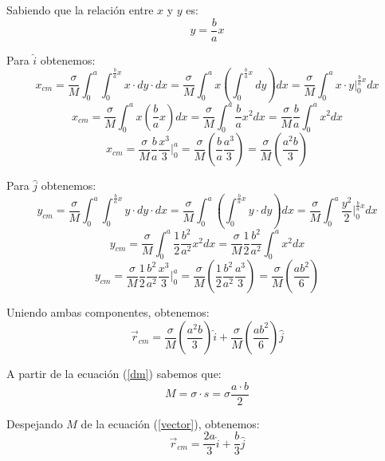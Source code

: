 \documentclass[letter,11pt]{article}
\begin{document}
Sabiendo que la relación entre $x$ y $y$ es:
\begin{equation*}
    y = \frac{b}{a} x
\end{equation*}

Para $\hat{i}$ obtenemos:
\begin{equation*}
    x_{cm} = \frac{\sigma}{M} \int_{0}^{a} \int_{0}^{\frac{b}{a}x} x \cdot dy \cdot dx = \frac{\sigma}{M} \int_{0}^{a} x \left(\int_{0}^{\frac{b}{a}x} dy \right) dx = \frac{\sigma}{M} \int_{0}^{a} x \cdot y\Biggr|_{0}^{\frac{b}{a}x} dx
\end{equation*}
\begin{equation*}
    x_{cm} = \frac{\sigma}{M} \int_{0}^{a} x \left(\frac{b}{a} x\right) dx = \frac{\sigma}{M} \int_{0}^{a} \frac{b}{a} x^2 dx = \frac{\sigma}{M} \frac{b}{a} \int_{0}^{a} x^2 dx
\end{equation*}
\begin{equation*}
    x_{cm} = \frac{\sigma}{M} \frac{b}{a} \frac{x^3}{3}\Biggr|_{0}^{a} = \frac{\sigma}{M} \left(\frac{b}{a} \frac{a^3}{3}\right) = \frac{\sigma}{M} \left(\frac{a^2 b}{3}\right)
\end{equation*}

Para $\hat{j}$ obtenemos:
\begin{equation*}
    y_{cm} = \frac{\sigma}{M} \int_{0}^{a} \int_{0}^{\frac{b}{a}x} y \cdot dy \cdot dx = \frac{\sigma}{M} \int_{0}^{a} \left(\int_{0}^{\frac{b}{a}x} y \cdot dy \right) dx = \frac{\sigma}{M} \int_{0}^{a} \frac{y^2}{2} \Biggr|_{0}^{\frac{b}{a}x} dx
\end{equation*}
\begin{equation*}
    y_{cm} = \frac{\sigma}{M} \int_{0}^{a} \frac{1}{2} \frac{b^2}{a^2} x^2 dx = \frac{\sigma}{M} \frac{1}{2} \frac{b^2}{a^2} \int_{0}^{a} x^2 dx
\end{equation*}
\begin{equation*}
    y_{cm} = \frac{\sigma}{M} \frac{1}{2} \frac{b^2}{a^2} \frac{x^3}{3} \Biggr|_{0}^{a} = \frac{\sigma}{M} \left( \frac{1}{2} \frac{b^2}{a^2} \frac{a^3}{3} \right) = \frac{\sigma}{M} \left( \frac{ab^2}{6} \right)
\end{equation*}

\vspace{0.5cm}
Uniendo ambas componentes, obtenemos:
\begin{equation}
    \vec{r}_{cm} = \frac{\sigma}{M} \left( \frac{a^2 b}{3} \right) \hat{i} + \frac{\sigma}{M} \left( \frac{a b^2}{6} \right) \hat{j}
\label{vector}
\end{equation}

A partir de la ecuación (\ref{dm}) sabemos que:
\begin{equation*}
    M = \sigma \cdot s = \sigma \frac{a \cdot b}{2}
\end{equation*}

Despejando $M$ de la ecuación (\ref{vector}), obtenemos:
\begin{equation*}
    \vec{r}_{cm} = \frac{2 a}{3} \hat{i} + \frac{b}{3} \hat{j}
\end{equation*}
\end{document}
